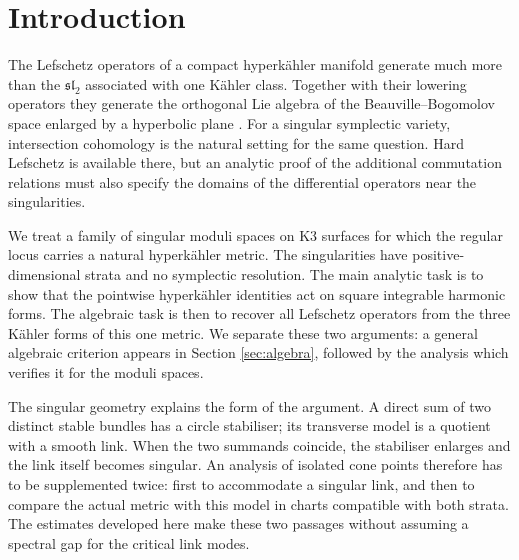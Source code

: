 \section{Introduction}\label{sec:intro}

The Lefschetz operators of a compact hyperk\"ahler manifold generate
much more than the $\mathfrak{sl}_2$ associated with one K\"ahler
class. Together with their lowering operators they generate the
orthogonal Lie algebra of the Beauville--Bogomolov space enlarged by
a hyperbolic plane \cite{verbitsky96,ll97}. For a singular symplectic
variety, intersection cohomology is the natural setting for the same
question. Hard Lefschetz is available there, but an analytic proof of
the additional commutation relations must also specify the domains
of the differential operators near the singularities.

We treat a family of singular moduli spaces on K3 surfaces for which
the regular locus carries a natural hyperk\"ahler metric. The
singularities have positive-dimensional strata and no symplectic
resolution. The main analytic task is to show that the pointwise
hyperk\"ahler identities act on square integrable harmonic forms.
The algebraic task is then to recover all Lefschetz operators from
the three K\"ahler forms of this one metric. We separate these two
arguments: a general algebraic criterion appears in Section
\ref{sec:algebra}, followed by the analysis which verifies it for
the moduli spaces.

The singular geometry explains the form of the argument. A direct
sum of two distinct stable bundles has a circle stabiliser; its
transverse model is a quotient with a smooth link. When the two
summands coincide, the stabiliser enlarges and the link itself
becomes singular. An analysis of isolated cone points therefore
has to be supplemented twice: first to accommodate a singular
link, and then to compare the actual metric with this model in
charts compatible with both strata. The estimates developed here
make these two passages without assuming a spectral gap for the
critical link modes.

